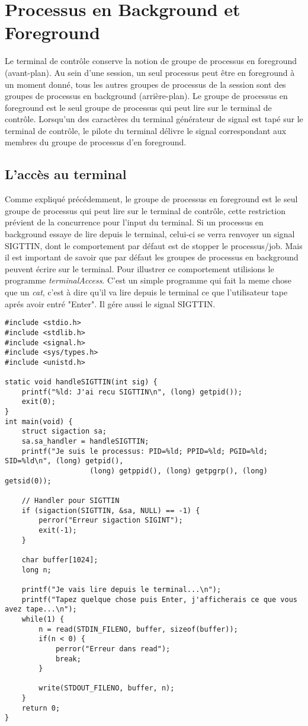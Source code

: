 \section{Processus en Background et Foreground}

Le terminal de contrôle conserve la notion de groupe de processus en foreground (avant-plan). Au sein d'une session, un seul processus peut être en foreground
à un moment donné, tous les autres groupes de processus de la session sont des groupes de processus en background (arrière-plan). Le groupe de processus en foreground
est le seul groupe de processus qui peut lire sur le terminal de contrôle. Lorsqu'un des caractères du terminal générateur de signal est tapé sur
le terminal de contrôle, le pilote du terminal délivre le signal correspondant aux membres du groupe de processus d’en foreground.


\subsection{L’accès au terminal}

Comme expliqué précédemment, le groupe de processus en foreground est le seul groupe de processus qui peut lire sur le terminal de contrôle,
cette restriction prévient de la concurrence pour l’input du terminal. Si un processus en background essaye de lire depuis le terminal, celui-ci
se verra renvoyer un signal SIGTTIN, dont le comportement par défaut est de stopper le processus/job. Mais il est important de savoir que par défaut
les groupes de processus en background peuvent écrire sur le terminal.
\newline
Pour illustrer ce comportement utilisions le programme \textit{terminalAccess}. C'est un simple programme qui fait la meme chose que un \textit{cat}, c'est à dire
qu'il va lire depuis le terminal ce que l'utilisateur tape aprés avoir entré "Enter". Il gére aussi le signal SIGTTIN.

\begin{lstlisting}[caption={terminalAccess.c}, label={terminalAccess.c}]
#include <stdio.h>
#include <stdlib.h>
#include <signal.h>
#include <sys/types.h>
#include <unistd.h>

static void handleSIGTTIN(int sig) {
    printf("%ld: J'ai recu SIGTTIN\n", (long) getpid());
    exit(0);
}
int main(void) {
	struct sigaction sa;
	sa.sa_handler = handleSIGTTIN;
	printf("Je suis le processus: PID=%ld; PPID=%ld; PGID=%ld; SID=%ld\n", (long) getpid(),
                    (long) getppid(), (long) getpgrp(), (long) getsid(0));

	// Handler pour SIGTTIN
    if (sigaction(SIGTTIN, &sa, NULL) == -1) {
		perror("Erreur sigaction SIGINT");
		exit(-1);
	}
        
	char buffer[1024];
	long n;

	printf("Je vais lire depuis le terminal...\n");
	printf("Tapez quelque chose puis Enter, j'afficherais ce que vous avez tape...\n");
	while(1) {
		n = read(STDIN_FILENO, buffer, sizeof(buffer)); 
		if(n < 0) {
			perror("Erreur dans read");
			break;
		}			
		
		write(STDOUT_FILENO, buffer, n);
	}	
	return 0;
}
\end{lstlisting}

